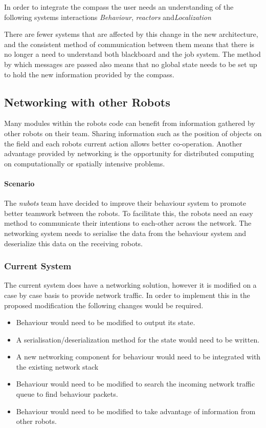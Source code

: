 \documentclass[english,12pt]{scrartcl}
\begin{document}
				In order to integrate the compass the user needs an understanding of the following systems interactions \emph{Behaviour}, \emph{\glspl{reactor}} and\emph{Localization}
				
				There are fewer systems that are affected by this change in the new architecture, and the consistent method of communication between them means that there is no longer a need to understand both blackboard and the job system.
				The method by which messages are passed also means that no global state needs to be set up to hold the new information provided by the compass.
				
		\subsection{Networking with other Robots}
			Many modules within the robots code can benefit from information gathered by other robots on their team. Sharing information such as the position of objects on the field and each robots current action allows better co-operation.
			Another advantage provided by networking is the opportunity for distributed computing on computationally or spatially intensive problems.
			
			\paragraph{Scenario} The \emph{\gls{nubots}} team have decided to improve their behaviour system to promote better teamwork between the robots.
			To facilitate this, the robots need an easy method to communicate their intentions to each-other across the network.
			The networking system needs to serialise the data from the behaviour system and deserialize this data on the receiving robots.
			
			\subsubsection{Current System}
				The current system does have a networking solution, however it is modified on a case by case basis to provide network traffic.
				In order to implement this in the proposed modification the following changes would be required.
								
				\begin{itemize}
					\item Behaviour would need to be modified to output its state.
					\item A serialisation/deserialization method for the state would need to be written.
					\item A new networking component for behaviour would need to be integrated with the existing network stack
					\item Behaviour would need to be modified to search the incoming network traffic queue to find behaviour packets.
					\item Behaviour would need to be modified to take advantage of information from other robots.
				\end{itemize}
				
\end{document}
